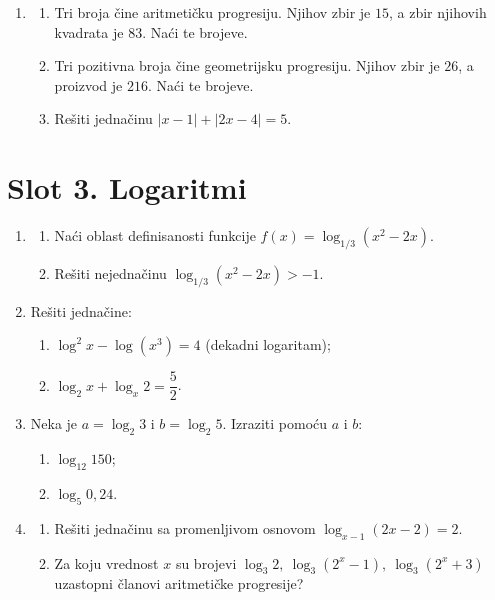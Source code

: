 \begin{enumerate}[label=\arabic*.]
\item \begin{enumerate}[label=\alph*)]
\item Tri broja čine aritmetičku progresiju. Njihov zbir je $15$, a zbir njihovih kvadrata je $83$. Naći te brojeve.
\item Tri pozitivna broja čine geometrijsku progresiju. Njihov zbir je $26$, a proizvod je $216$. Naći te brojeve.
\item Rešiti jednačinu $|x-1|+|2x-4|=5$.
\end{enumerate}
\end{enumerate}
\clearpage
\section*{Slot 3. Logaritmi}
\begin{enumerate}[label=\arabic*.]
\item
\begin{enumerate}[label=\alph*)]
\item Naći oblast definisanosti funkcije $f(x)=\log_{1/3}\left(x^{2}-2x\right)$.
\item Rešiti nejednačinu $\log_{1/3}\left(x^{2}-2x\right) > -1$.
\end{enumerate}

\item Rešiti jednačine:
\begin{enumerate}[label=\alph*)]
\item $\log^{2} x-\log\left(x^{3}\right)=4$ (dekadni logaritam);
\item $\log_{2} x+\log_{x} 2=\dfrac{5}{2}$.
\end{enumerate}

\item Neka je $a=\log_{2}3$ i $b=\log_{2}5$. Izraziti pomoću $a$ i $b$:
\begin{enumerate}[label=\alph*)]
\item $\log_{12}150$;
\item $\log_{5}0{,}24$.
\end{enumerate}

\item
\begin{enumerate}[label=\alph*)]
\item Rešiti jednačinu sa promenljivom osnovom $\log_{x-1}(2x-2)=2$.
\item Za koju vrednost $x$ su brojevi $\log_{3}2,\ \log_{3}\left(2^{x}-1\right),\ \log_{3}\left(2^{x}+3\right)$ uzastopni članovi aritmetičke progresije?
\end{enumerate}


\end{enumerate}
